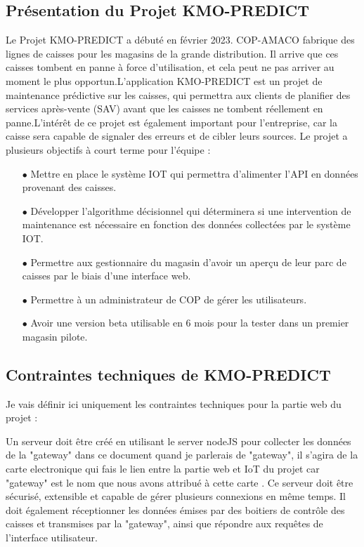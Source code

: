 \documentclass[12pt]{article}
\begin{document}
\subsection{Présentation du Projet KMO-PREDICT}
\justify
\text Le Projet KMO-PREDICT a débuté en février 2023. COP-AMACO fabrique des lignes de caisses pour les magasins de la grande distribution. Il arrive que ces caisses tombent en panne à force d'utilisation, et cela peut ne pas arriver au moment le plus opportun.L'application KMO-PREDICT est un projet de maintenance prédictive sur les caisses, qui permettra aux clients de planifier des services après-vente (SAV) avant que les caisses ne tombent réellement en panne.L'intérêt de ce projet est également important pour l'entreprise, car la caisse sera capable de signaler des erreurs et de cibler leurs sources. Le projet a plusieurs objectifs à court terme pour l'équipe :
\begin{itemize}
 \item [$\bullet$] Mettre en place le système IOT qui permettra d'alimenter l'API en données provenant des caisses.
\item [$\bullet$] Développer l'algorithme décisionnel qui déterminera si une intervention de maintenance est nécessaire en fonction des données collectées par le système IOT.
\item [$\bullet$] Permettre aux gestionnaire du magasin d'avoir un aperçu de leur parc de caisses par le biais d'une interface web.
\item [$\bullet$]  Permettre à un administrateur de COP de gérer les utilisateurs.
\item [$\bullet$] Avoir une version beta utilisable en 6 mois pour la tester dans un premier magasin pilote.
\end{itemize}

\subsection{Contraintes techniques de KMO-PREDICT}
\justify
\text Je vais définir ici uniquement les contraintes techniques pour la partie web du projet :

\justify
\text Un serveur doit être créé en utilisant le server nodeJS pour collecter les données de la "gateway" dans ce document quand je parlerais de "gateway", il s'agira de la carte electronique qui fais le lien entre la partie web et IoT du projet car "gateway" est le nom que nous avons attribué à cette carte . Ce serveur doit être sécurisé, extensible et capable de gérer plusieurs connexions en même temps. Il doit également réceptionner les données émises par des boitiers de contrôle des caisses et transmises par la "gateway", ainsi que répondre aux requêtes de l'interface utilisateur.
\end{document}
